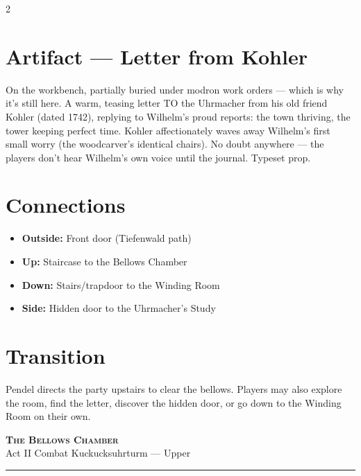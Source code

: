 \documentclass[10pt,letterpaper]{article}
\newcommand{\sceneheader}[4]{%
  \fancyhead[L]{\small\textcolor{accent}{\scshape #1}}%
  \fancyhead[R]{\small\textcolor{accent}{#2 \quad \textbullet \quad #3}}%
  \begin{center}
  {\LARGE\bfseries\scshape\textcolor{accent}{#1}}\\[2pt]
  {\small #2 \quad \textbullet \quad #3 \quad \textbullet \quad #4}\\[2pt]
  \textcolor{rulecol}{\rule{0.5\textwidth}{0.8pt}}
  \end{center}
  \vspace{-4pt}
}
\begin{document}
\begin{multicols}{2}
\section*{Artifact --- Letter from Kohler}
On the workbench, partially buried under modron work orders --- which is why it's still here. A warm, teasing letter TO the Uhrmacher from his old friend Kohler (dated 1742), replying to Wilhelm's proud reports: the town thriving, the tower keeping perfect time. Kohler affectionately waves away Wilhelm's first small worry (the woodcarver's identical chairs). No doubt anywhere --- the players don't hear Wilhelm's own voice until the journal. Typeset prop.

\section*{Connections}
\begin{itemize}
\item \textbf{Outside:} Front door (Tiefenwald path)
\item \textbf{Up:} Staircase to the Bellows Chamber
\item \textbf{Down:} Stairs/trapdoor to the Winding Room
\item \textbf{Side:} Hidden door to the Uhrmacher's Study
\end{itemize}

\section*{Transition}
Pendel directs the party upstairs to clear the bellows. Players may also explore the room, find the letter, discover the hidden door, or go down to the Winding Room on their own.

\end{multicols}

\newpage


\label{sec:bellows}\sceneheader{The Bellows Chamber}{Act II}{Combat}{Kuckucksuhrturm --- Upper}
\end{document}
